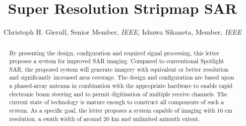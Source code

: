 \documentclass[journal]{IEEEtran}
\title{Super Resolution Stripmap SAR}
\author{Christoph H. Gierull, Senior Member, \textsl{IEEE}, Ishuwa Sikaneta, Member, \textsl{IEEE}}
\begin{document}
\maketitle
%
%
\begin{abstract}
By presenting the design, configuration and required signal processing, this letter proposes a system for improved SAR imaging. Compared to conventional Spotlight SAR, the proposed system will generate imagery with equivalent or better resolution and significantly increased area coverage. The design and configuration are based upon a phased-array antenna in combination with the appropriate hardware to enable rapid electronic beam steering and to permit digitisation of multiple receive channels. The current state of technology is mature enough to construct all components of such a system. As a specific goal, the letter proposes a system capable of imaging with 10 cm resolution, a swath width of around 20 km and unlimited azimuth extent.   
\end{abstract}
\end{document}
